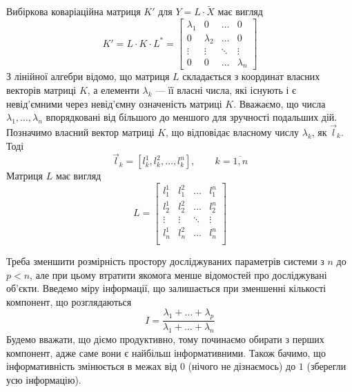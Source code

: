 Вибіркова коваріаційна матриця $K'$ для $Y = L \cdot \tilde{X}$ має вигляд
\begin{equation*}
  K'
  = L \cdot K \cdot L^*
  = \begin{bmatrix}
    \lambda_1 & 0         & \dots  & 0      \\
    0         & \lambda_2 & \dots  & 0      \\
    \vdots    & \vdots    & \ddots & \vdots \\
    0         & 0         & \dots  & \lambda_n
  \end{bmatrix}
\end{equation*}
З лінійної алгебри відомо, що матриця $L$ складається з координат власних
векторів матриці $K$, а елементи $\lambda_k$ --- її власні числа, які
існують і є невід’ємними через невід’ємну означеність матриці $K$.
Вважаємо, що числа $\lambda_1, \dots, \lambda_n$ впорядковані від більшого до
меншого для зручності подальших дій.
Позначимо власний вектор матриці $K$, що відповідає власному числу $\lambda_k$,
як $\vec{l}_k$. Тоді
\begin{equation*}
  \vec{l}_k
  = \left[ l_k^1, l_k^2, \dots, l_k^n \right],
  \qquad k = \overline{1,n}
\end{equation*}
Матриця $L$ має вигляд
\begin{equation*}
  L = \begin{bmatrix}
    l_1^1  & l_1^2  & \dots  & l_1^n  \\
    l_2^1  & l_2^2  & \dots  & l_2^n  \\
    \vdots & \vdots & \ddots & \vdots \\
    l_n^1  & l_n^2  & \dots  & l_n^n  \\
  \end{bmatrix}
\end{equation*}

Треба зменшити розмірність простору досліджуваних параметрів системи з $n$ до
$p<n$, але при цьому втратити якомога менше відомостей про досліджувані
об’єкти.
Введемо міру інформації, що залишається при зменшенні кількості компонент, що
розглядаються
\begin{equation*}
  I = \frac{\lambda_1 + \dots + \lambda_p}{\lambda_1 + \dots + \lambda_n}
\end{equation*}
Будемо вважати, що діємо продуктивно, тому починаємо обирати з перших
компонент, адже саме вони є найбільш інформативними.
Також бачимо, що інформативність змінюється в межах від $0$
(нічого не дізнаємось) до $1$ (зберегли усю інформацію).

